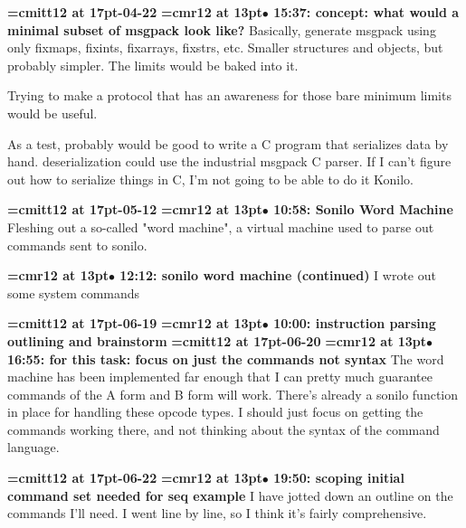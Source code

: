 {\medskip\noindent\bf\font\titlefont=cmitt12 at 17pt-04-22}\medskip
{\smallskip\noindent\bf\font\titlefont=cmr12 at 13pt\titlefont $\bullet$ 15:37: concept: what would a minimal subset of msgpack look like?}\smallskip
Basically, generate msgpack using only fixmaps, fixints, fixarrays, fixstrs, etc. Smaller structures and objects, but probably simpler. The limits would be baked into it.
\par

Trying to make a protocol that has an awareness for those bare minimum limits would be useful.
\par

As a test, probably would be good to write a C program that serializes data by hand. deserialization could use the industrial msgpack C parser. If I can't figure out how to serialize things in C, I'm not going to be able to do it Konilo.
\par

{\medskip\noindent\bf\font\titlefont=cmitt12 at 17pt-05-12}\medskip
{\smallskip\noindent\bf\font\titlefont=cmr12 at 13pt\titlefont $\bullet$ 10:58: Sonilo Word Machine}\smallskip
Fleshing out a so-called "word machine", a virtual machine used to parse out commands sent to sonilo.
\par

{\smallskip\noindent\bf\font\titlefont=cmr12 at 13pt\titlefont $\bullet$ 12:12: sonilo word machine (continued)}\smallskip
I wrote out some system commands
\par

{\medskip\noindent\bf\font\titlefont=cmitt12 at 17pt-06-19}\medskip
{\smallskip\noindent\bf\font\titlefont=cmr12 at 13pt\titlefont $\bullet$ 10:00: instruction parsing outlining and brainstorm}\smallskip
{\medskip\noindent\bf\font\titlefont=cmitt12 at 17pt-06-20}\medskip
{\smallskip\noindent\bf\font\titlefont=cmr12 at 13pt\titlefont $\bullet$ 16:55: for this task: focus on just the commands not syntax}\smallskip
The word machine has been implemented far enough that I can pretty much guarantee commands of the A form and B form will work. There's already a sonilo function in place for handling these opcode types. I should just focus on getting the commands working there, and not thinking about the syntax of the command language.
\par

{\medskip\noindent\bf\font\titlefont=cmitt12 at 17pt-06-22}\medskip
{\smallskip\noindent\bf\font\titlefont=cmr12 at 13pt\titlefont $\bullet$ 19:50: scoping initial command set needed for seq example}\smallskip
I have jotted down an outline on the commands I'll need. I went line by line, so I think it's fairly comprehensive.
\par

